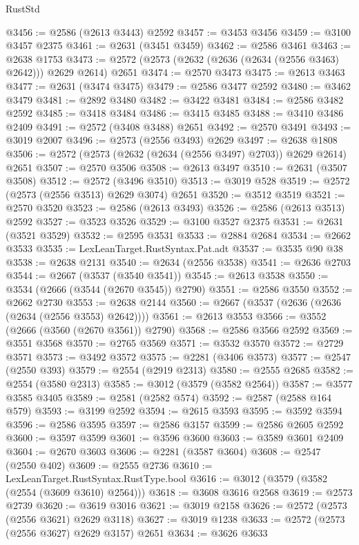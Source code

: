 \begin{lexlean}{RustStd}
\begin{coremodule}
@3456 := @2586 (@2613 @3443) @2592
@3457 := @3453 @3456
@3459 := @3100 @3457 @2375
@3461 := @2631 (@3451 @3459)
@3462 := @2586 @3461
@3463 := @2638 @1753
@3473 := @2572 (@2573 (@2632 (@2636 (@2634 (@2556 @3463) @2642))) @2629 @2614) @2651
@3474 := @2570 @3473
@3475 := @2613 @3463
@3477 := @2631 (@3474 @3475)
@3479 := @2586 @3477 @2592
@3480 := @3462 @3479
@3481 := @2892 @3480
@3482 := @3422 @3481
@3484 := @2586 @3482 @2592
@3485 := @3418 @3484
@3486 := @3415 @3485
@3488 := @3410 @3486 @2409
@3491 := @2572 (@3408 @3488) @2651
@3492 := @2570 @3491
@3493 := @3019 @2007
@3496 := @2573 (@2556 @3493) @2629
@3497 := @2638 @1808
@3506 := @2572 (@2573 (@2632 (@2634 (@2556 @3497) @2703)) @2629 @2614) @2651
@3507 := @2570 @3506
@3508 := @2613 @3497
@3510 := @2631 (@3507 @3508)
@3512 := @2572 (@3496 @3510)
@3513 := @3019 @528
@3519 := @2572 (@2573 (@2556 @3513) @2629 @3074) @2651
@3520 := @3512 @3519
@3521 := @2570 @3520
@3523 := @2586 (@2613 @3493)
@3526 := @2586 (@2613 @3513) @2592
@3527 := @3523 @3526
@3529 := @3100 @3527 @2375
@3531 := @2631 (@3521 @3529)
@3532 := @2595 @3531
@3533 := @2884 @2684
@3534 := @2662 @3533
@3535 := LexLeanTarget.RustSyntax.Pat.adt
@3537 := @3535 @90 @38
@3538 := @2638 @2131
@3540 := @2634 (@2556 @3538)
@3541 := @2636 @2703
@3544 := @2667 (@3537 (@3540 @3541))
@3545 := @2613 @3538
@3550 := @3534 (@2666 (@3544 (@2670 @3545)) @2790)
@3551 := @2586 @3550
@3552 := @2662 @2730
@3553 := @2638 @2144
@3560 := @2667 (@3537 (@2636 (@2636 (@2634 (@2556 @3553) @2642))))
@3561 := @2613 @3553
@3566 := @3552 (@2666 (@3560 (@2670 @3561)) @2790)
@3568 := @2586 @3566 @2592
@3569 := @3551 @3568
@3570 := @2765 @3569
@3571 := @3532 @3570
@3572 := @2729 @3571
@3573 := @3492 @3572
@3575 := @2281 (@3406 @3573)
@3577 := @2547 (@2550 @393)
@3579 := @2554 (@2919 @2313)
@3580 := @2555 @2685
@3582 := @2554 (@3580 @2313)
@3585 := @3012 (@3579 (@3582 @2564))
@3587 := @3577 @3585 @3405
@3589 := @2581 (@2582 @574)
@3592 := @2587 (@2588 @164 @579)
@3593 := @3199 @2592
@3594 := @2615 @3593
@3595 := @3592 @3594
@3596 := @2586 @3595
@3597 := @2586 @3157
@3599 := @2586 @2605 @2592
@3600 := @3597 @3599
@3601 := @3596 @3600
@3603 := @3589 @3601 @2409
@3604 := @2670 @3603
@3606 := @2281 (@3587 @3604)
@3608 := @2547 (@2550 @402)
@3609 := @2555 @2736
@3610 := LexLeanTarget.RustSyntax.RustType.bool
@3616 := @3012 (@3579 (@3582 (@2554 (@3609 @3610) @2564)))
@3618 := @3608 @3616 @2568
@3619 := @2573 @2739
@3620 := @3619 @3016
@3621 := @3019 @2158
@3626 := @2572 (@2573 (@2556 @3621) @2629 @3118)
@3627 := @3019 @1238
@3633 := @2572 (@2573 (@2556 @3627) @2629 @3157) @2651
@3634 := @3626 @3633

\end{coremodule}
\end{lexlean}

